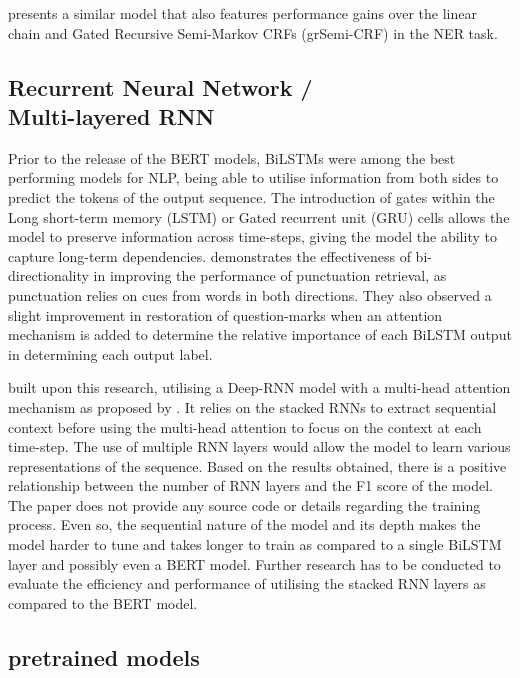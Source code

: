 \documentclass[a4paper]{article}
\begin{document}
\begin{multicols}{2}
\cite{hybridsemimarkovcrf} presents a similar model that also features performance gains over the linear chain and Gated Recursive
Semi-Markov CRFs (grSemi-CRF) \citep{grsemicrf} in the NER task. 



\subsection{\texorpdfstring{Recurrent Neural Network / \\ Multi-layered RNN}{Recurrent Neural Network / Multi-layered RNN}}
Prior to the release of the BERT models, BiLSTMs were among the best performing models for NLP, being able to utilise information from both sides to predict the tokens of the output sequence. The introduction of gates within the Long short-term memory (LSTM) or Gated recurrent unit (GRU) cells allows the model to preserve information across time-steps, giving the model the ability to capture long-term dependencies.  
\cite{birnnattention} demonstrates the effectiveness of bi-directionality in improving the performance of punctuation retrieval, as punctuation relies on cues from words in both directions. They also observed a slight improvement in restoration of question-marks when an attention mechanism is added to determine the relative importance of each BiLSTM output in determining each output label.

\cite{kim_2019} built upon this research, utilising a Deep-RNN model with a multi-head attention mechanism as proposed by \cite{attentionisallyouneed}. It relies on the stacked RNNs to extract sequential context before using the multi-head attention to focus on the context at each time-step. The use of multiple RNN layers would allow the model to learn various representations of the sequence. Based on the results obtained, there is a positive relationship between the number of RNN layers and the F1 score of the model. The paper does not provide any source code or details regarding the training process. Even so, the sequential nature of the model and its depth makes the model harder to tune and takes longer to train as compared to a single BiLSTM layer and possibly even a BERT model. Further research has to be conducted to evaluate the efficiency and performance of utilising the stacked RNN layers as compared to the BERT model.

\subsection{pretrained models}

\end{multicols}
\end{document}
